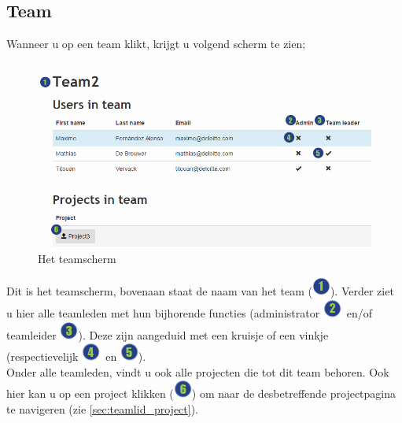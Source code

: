 \documentclass[a4paper,11pt]{article}
\newcommand{\one}{\includegraphics[scale=0.5]{Gebruikershandleiding_img/1.png}}
\newcommand{\two}{\includegraphics[scale=0.5]{Gebruikershandleiding_img/2.png}}
\newcommand{\three}{\includegraphics[scale=0.5]{Gebruikershandleiding_img/3.png}}
\newcommand{\four}{\includegraphics[scale=0.5]{Gebruikershandleiding_img/4.png}}
\newcommand{\five}{\includegraphics[scale=0.5]{Gebruikershandleiding_img/5.png}}
\newcommand{\six}{\includegraphics[scale=0.5]{Gebruikershandleiding_img/6.png}}
\begin{document}
\subsection{Team}
\label{sec:teamlid_team}
Wanneer u op een team klikt, krijgt u volgend scherm te zien;

\begin{figure}[H]
\centering
\includegraphics[scale=0.5]{Gebruikershandleiding_img/team.png}
\caption{Het teamscherm}
\label{fig:teamlid_team}
\end{figure}

Dit is het teamscherm, bovenaan staat de naam van het team (\one). Verder ziet u hier alle teamleden met hun bijhorende functies (administrator \two\ en/of teamleider \three). Deze zijn aangeduid met een kruisje of een vinkje (respectievelijk \four\ en \five).\\
Onder alle teamleden, vindt u ook alle projecten die tot dit team behoren. Ook hier kan u op een project klikken (\six) om naar de desbetreffende projectpagina te navigeren (zie \autoref{sec:teamlid_project}).
\end{document}
